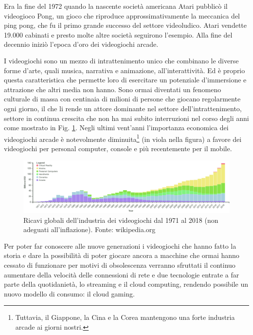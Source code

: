 %
%

Era la fine del 1972 quando la nascente società americana Atari pubblicò il videogioco Pong, un gioco che riproduce approssimativamente la meccanica del ping pong, che fu il primo grande successo del settore videoludico. Atari vendette 19.000 cabinati e presto molte altre società seguirono l'esempio. Alla fine del decennio iniziò l'epoca d'oro dei videogiochi arcade\cite{High_Score}.

I videogiochi sono un mezzo di intrattenimento unico che combinano le diverse forme d'arte, quali musica, narrativa e animazione, all'interattività. Ed è proprio questa caratteristica che permette loro di esercitare un potenziale d'immersione e attrazione che altri media non hanno. Sono ormai diventati un fenomeno culturale di massa con centinaia di milioni di persone che giocano regolarmente ogni giorno, il che li rende un attore dominante nel settore dell'intrattenimento, settore in continua crescita che non ha mai subito interruzioni nel corso degli anni come mostrato in Fig. \ref{fig:valore_commerciale_giochi_globale}. Negli ultimi vent'anni l'importanza economica dei videogiochi arcade è notevolmente diminuita\footnote{Tuttavia, il Giappone, la Cina e la Corea mantengono una forte industria arcade ai giorni nostri.} (in viola nella figura) a favore dei videogiochi per personal computer, console e più recentemente per il mobile.

\begin{figure}[H]
	\includegraphics[width=\linewidth]{immagini/valore_commerciale_giochi_globale.png}
	\caption{Ricavi globali dell'industria dei videogiochi dal 1971 al 2018 (non adeguati all'inflazione). Fonte: wikipedia.org}
	\label{fig:valore_commerciale_giochi_globale}
\end{figure}

Per poter far conoscere alle nuove generazioni i videogiochi che hanno fatto la storia e dare la possibilità di poter giocare ancora a macchine che ormai hanno cessato di funzionare per motivi di obsolescenza verranno sfruttati il continuo aumentare della velocità delle connessioni di rete e due tecnologie entrate a far parte della quotidanietà, lo streaming e il cloud computing, rendendo possibile un nuovo modello di consumo: il cloud gaming.

